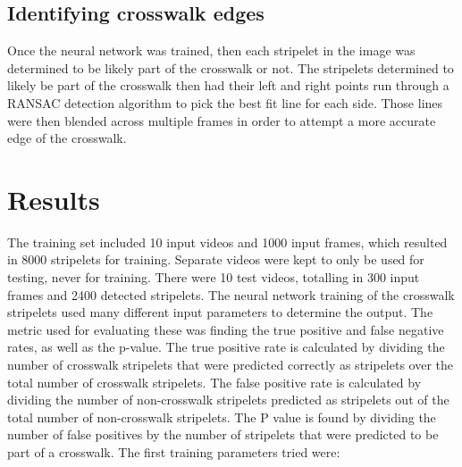\documentclass[12pt]{ucthesis}
\begin{document}
\section{Identifying crosswalk edges}
Once the neural network was trained, then each stripelet in the image was determined to be likely part of the crosswalk or not. The stripelets determined to likely be part of the crosswalk then had their left and right points run through a RANSAC detection algorithm to pick the best fit line for each side. 
Those lines were then blended across multiple frames in order to attempt a more accurate edge of the crosswalk. 

\chapter{Results}
\label{results}




The training set included 10 input videos and 1000 input frames, which resulted in 8000 stripelets for training. Separate videos were kept to only be used for testing, never for training. There were 10 test videos, totalling in 300 input frames and 2400 detected stripelets. The neural network training of the crosswalk stripelets used many different input parameters to determine the output. The metric used for evaluating these was finding the true positive and false negative rates, as well as the p-value. The true positive rate is calculated by dividing the number of crosswalk stripelets that were predicted correctly as stripelets over the total number of crosswalk stripelets. The false positive rate is calculated by dividing the number of non-crosswalk stripelets predicted as stripelets out of the total number of non-crosswalk stripelets. The P value is found by dividing the number of false positives by the number of stripelets that were predicted to be part of a crosswalk.  The first training parameters tried were:
\end{document}
